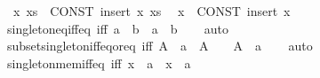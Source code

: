 \begin{isabellebody}
\isanewline
\ \ {\isachardoublequoteopen}{\isacharbraceleft}{\kern0pt}x{\isacharcomma}{\kern0pt}\ xs{\isacharbraceright}{\kern0pt}{\isachardoublequoteclose}\ {\isasymrightleftharpoons}\ {\isachardoublequoteopen}CONST\ insert\ x\ {\isacharbraceleft}{\kern0pt}xs{\isacharbraceright}{\kern0pt}{\isachardoublequoteclose}\isanewline
\ \ {\isachardoublequoteopen}{\isacharbraceleft}{\kern0pt}x{\isacharbraceright}{\kern0pt}{\isachardoublequoteclose}\ {\isasymrightleftharpoons}\ {\isachardoublequoteopen}CONST\ insert\ x\ {\isacharbraceleft}{\kern0pt}{\isacharbraceright}{\kern0pt}{\isachardoublequoteclose}\isanewline
\isanewline
{}\isamarkupfalse%
\ singleton{\isacharunderscore}{\kern0pt}eq{\isacharunderscore}{\kern0pt}iff{\isacharunderscore}{\kern0pt}eq\ {\isacharbrackleft}{\kern0pt}iff{\isacharbrackright}{\kern0pt}{\isacharcolon}{\kern0pt}\ {\isachardoublequoteopen}{\isacharbraceleft}{\kern0pt}a{\isacharbraceright}{\kern0pt}\ {\isacharequal}{\kern0pt}\ {\isacharbraceleft}{\kern0pt}b{\isacharbraceright}{\kern0pt}\ {\isasymlongleftrightarrow}\ a\ {\isacharequal}{\kern0pt}\ b{\isachardoublequoteclose}\isanewline
%
\isadelimproof
\ \ %
\endisadelimproof
%
\isatagproof
{}\isamarkupfalse%
\ auto%
\endisatagproof
{\isafoldproof}%
%
\isadelimproof
\isanewline
%
\endisadelimproof
\isanewline
{}\isamarkupfalse%
\ subset{\isacharunderscore}{\kern0pt}singleton{\isacharunderscore}{\kern0pt}iff{\isacharunderscore}{\kern0pt}eq{\isacharunderscore}{\kern0pt}or{\isacharunderscore}{\kern0pt}eq\ {\isacharbrackleft}{\kern0pt}iff{\isacharbrackright}{\kern0pt}{\isacharcolon}{\kern0pt}\ {\isachardoublequoteopen}A\ {\isasymsubseteq}\ {\isacharbraceleft}{\kern0pt}a{\isacharbraceright}{\kern0pt}\ {\isasymlongleftrightarrow}\ A\ {\isacharequal}{\kern0pt}\ {\isacharbraceleft}{\kern0pt}{\isacharbraceright}{\kern0pt}\ {\isasymor}\ A\ {\isacharequal}{\kern0pt}\ {\isacharbraceleft}{\kern0pt}a{\isacharbraceright}{\kern0pt}{\isachardoublequoteclose}\isanewline
%
\isadelimproof
\ \ %
\endisadelimproof
%
\isatagproof
{}\isamarkupfalse%
\ auto%
\endisatagproof
{\isafoldproof}%
%
\isadelimproof
\isanewline
%
\endisadelimproof
\isanewline
{}\isamarkupfalse%
\ singleton{\isacharunderscore}{\kern0pt}mem{\isacharunderscore}{\kern0pt}iff{\isacharunderscore}{\kern0pt}eq\ {\isacharbrackleft}{\kern0pt}iff{\isacharbrackright}{\kern0pt}{\isacharcolon}{\kern0pt}\ {\isachardoublequoteopen}x\ {\isasymin}\ {\isacharbraceleft}{\kern0pt}a{\isacharbraceright}{\kern0pt}\ {\isasymlongleftrightarrow}\ x\ {\isacharequal}{\kern0pt}\ a{\isachardoublequoteclose}%

\end{isabellebody}
